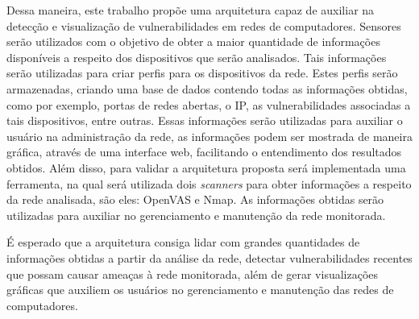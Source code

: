 Dessa maneira, este trabalho propõe uma arquitetura capaz de auxiliar na detecção e visualização de vulnerabilidades em redes de computadores. Sensores serão utilizados com o objetivo de obter a maior quantidade de informações disponíveis a respeito dos dispositivos que serão analisados. Tais informações serão utilizadas para criar perfis para os dispositivos da rede. Estes perfis serão armazenadas, criando uma base de dados contendo todas as informações obtidas, como por exemplo, portas de redes abertas,  o \gls{IP}, as vulnerabilidades associadas a tais dispositivos, entre outras. Essas informações serão utilizadas para auxiliar o usuário na administração da rede, as informações podem ser mostrada de maneira gráfica, através de uma interface web, facilitando o entendimento dos resultados obtidos. Além disso, para validar a arquitetura proposta será implementada uma ferramenta, na qual será utilizada dois \textit{scanners} para obter informações a respeito da rede analisada, são eles: \gls{OpenVAS} e \gls{Nmap}. As informações obtidas serão utilizadas para auxiliar no gerenciamento e manutenção da rede monitorada. 

É esperado que a arquitetura consiga lidar com grandes quantidades de informações obtidas a partir da análise da rede, detectar vulnerabilidades recentes que possam causar ameaças à rede monitorada, além de gerar visualizações gráficas que auxiliem os usuários no gerenciamento e manutenção das redes de computadores.





